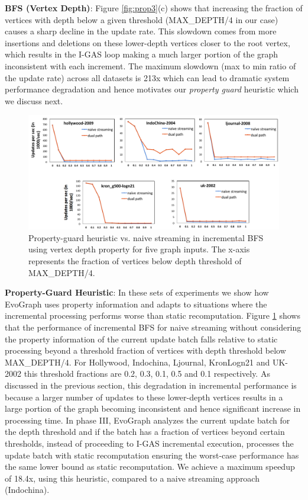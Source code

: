 \textbf{BFS (Vertex Depth)}:  Figure \ref{fig:prop3}(c) shows that increasing the fraction of vertices with depth below a given threshold (MAX\_DEPTH/4 in our case) causes a sharp decline in the update rate. This slowdown comes from more insertions and deletions on these lower-depth vertices closer to the root vertex, which results in the I-GAS loop making a much larger portion of the graph inconsistent with each increment. The maximum slowdown (max to min ratio of the update rate) across all datasets is 213x which can lead to dramatic system performance degradation and hence motivates our \textit{property guard} heuristic which we discuss next.


\begin{figure}[!t]
\centering
\includegraphics [width=\textwidth,height=\textheight,keepaspectratio]{figures/prop_guard.pdf}
\caption{Property-guard heuristic vs. naive streaming in incremental BFS using vertex depth property for five graph inputs. The x-axis represents the fraction of vertices below depth threshold of MAX\_DEPTH/4. }
\label{fig:five}
\end{figure}

\textbf{Property-Guard Heuristic}: In these sets of experiments we show how EvoGraph uses property information and adapts to situations where the incremental processing performs worse than static recomputation. Figure \ref{fig:five} shows that the performance of incremental BFS for naive streaming without considering the property information of the current update batch falls relative to static processing beyond a threshold fraction of vertices with depth threshold below MAX\_DEPTH/4. For Hollywood, Indochina, Ljournal, KronLogn21 and UK-2002 this threshold fractions are 0.2, 0.3, 0.1, 0.5 and 0.1 respectively. As discussed in the previous section, this degradation in incremental performance is because a larger number of updates to these lower-depth vertices results in a large portion of the graph becoming inconsistent and hence significant increase in processing time. In phase III, EvoGraph analyzes the current update batch for the depth threshold and if the batch has a fraction of vertices beyond certain thresholds, instead of proceeding to I-GAS incremental execution, processes the update batch with static recomputation ensuring the worst-case performance has the same lower bound as static recomputation. We achieve a maximum speedup of 18.4x, using this heuristic, compared to a naive streaming approach (Indochina). 

